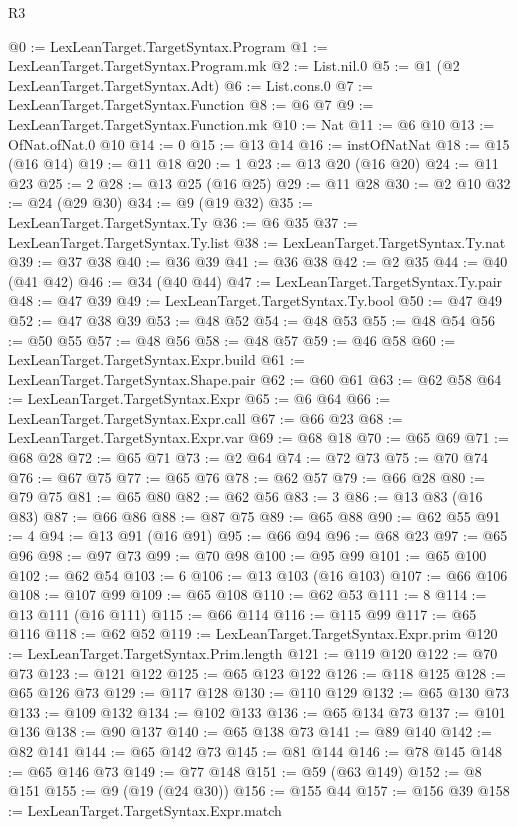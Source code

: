 \begin{lexlean}{R3}
\begin{coremodule}
{{{{{{{{{{{{{{{{@0 := LexLeanTarget.TargetSyntax.Program
@1 := LexLeanTarget.TargetSyntax.Program.mk
@2 := List.nil.{0}
@5 := @1 (@2 LexLeanTarget.TargetSyntax.Adt)
@6 := List.cons.{0}
@7 := LexLeanTarget.TargetSyntax.Function
@8 := @6 @7
@9 := LexLeanTarget.TargetSyntax.Function.mk
@10 := Nat
@11 := @6 @10
@13 := OfNat.ofNat.{0} @10
@14 := 0
@15 := @13 @14
@16 := instOfNatNat
@18 := @15 (@16 @14)
@19 := @11 @18
@20 := 1
@23 := @13 @20 (@16 @20)
@24 := @11 @23
@25 := 2
@28 := @13 @25 (@16 @25)
@29 := @11 @28
@30 := @2 @10
@32 := @24 (@29 @30)
@34 := @9 (@19 @32)
@35 := LexLeanTarget.TargetSyntax.Ty
@36 := @6 @35
@37 := LexLeanTarget.TargetSyntax.Ty.list
@38 := LexLeanTarget.TargetSyntax.Ty.nat
@39 := @37 @38
@40 := @36 @39
@41 := @36 @38
@42 := @2 @35
@44 := @40 (@41 @42)
@46 := @34 (@40 @44)
@47 := LexLeanTarget.TargetSyntax.Ty.pair
@48 := @47 @39
@49 := LexLeanTarget.TargetSyntax.Ty.bool
@50 := @47 @49
@52 := @47 @38 @39
@53 := @48 @52
@54 := @48 @53
@55 := @48 @54
@56 := @50 @55
@57 := @48 @56
@58 := @48 @57
@59 := @46 @58
@60 := LexLeanTarget.TargetSyntax.Expr.build
@61 := LexLeanTarget.TargetSyntax.Shape.pair
@62 := @60 @61
@63 := @62 @58
@64 := LexLeanTarget.TargetSyntax.Expr
@65 := @6 @64
@66 := LexLeanTarget.TargetSyntax.Expr.call
@67 := @66 @23
@68 := LexLeanTarget.TargetSyntax.Expr.var
@69 := @68 @18
@70 := @65 @69
@71 := @68 @28
@72 := @65 @71
@73 := @2 @64
@74 := @72 @73
@75 := @70 @74
@76 := @67 @75
@77 := @65 @76
@78 := @62 @57
@79 := @66 @28
@80 := @79 @75
@81 := @65 @80
@82 := @62 @56
@83 := 3
@86 := @13 @83 (@16 @83)
@87 := @66 @86
@88 := @87 @75
@89 := @65 @88
@90 := @62 @55
@91 := 4
@94 := @13 @91 (@16 @91)
@95 := @66 @94
@96 := @68 @23
@97 := @65 @96
@98 := @97 @73
@99 := @70 @98
@100 := @95 @99
@101 := @65 @100
@102 := @62 @54
@103 := 6
@106 := @13 @103 (@16 @103)
@107 := @66 @106
@108 := @107 @99
@109 := @65 @108
@110 := @62 @53
@111 := 8
@114 := @13 @111 (@16 @111)
@115 := @66 @114
@116 := @115 @99
@117 := @65 @116
@118 := @62 @52
@119 := LexLeanTarget.TargetSyntax.Expr.prim
@120 := LexLeanTarget.TargetSyntax.Prim.length
@121 := @119 @120
@122 := @70 @73
@123 := @121 @122
@125 := @65 @123 @122
@126 := @118 @125
@128 := @65 @126 @73
@129 := @117 @128
@130 := @110 @129
@132 := @65 @130 @73
@133 := @109 @132
@134 := @102 @133
@136 := @65 @134 @73
@137 := @101 @136
@138 := @90 @137
@140 := @65 @138 @73
@141 := @89 @140
@142 := @82 @141
@144 := @65 @142 @73
@145 := @81 @144
@146 := @78 @145
@148 := @65 @146 @73
@149 := @77 @148
@151 := @59 (@63 @149)
@152 := @8 @151
@155 := @9 (@19 (@24 @30))
@156 := @155 @44
@157 := @156 @39
@158 := LexLeanTarget.TargetSyntax.Expr.match
}}}}}}}}}}}}}}}}
\end{coremodule}
\end{lexlean}
